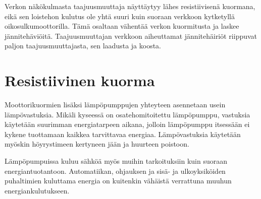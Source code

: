   Verkon näkökulmasta taajuusmuuttaja näyttäytyy lähes resistiivisenä kuormana, eikä sen loistehon kulutus ole yhtä suuri kuin suoraan verkkoon kytketyllä oikosulkumoottorilla. Tämä osaltaan vähentää verkon kuormitusta ja laskee jännitehäviöitä. Taajuusmuuttajan verkkoon aiheuttamat jännitehäiriöt riippuvat paljon taajuusmuuttajasta, sen laadusta ja koosta.

\section{Resistiivinen kuorma}
  Moottorikuormien lisäksi lämpöpumppujen yhteyteen asennetaan usein lämpövastuksia. Mikäli kyseessä on osatehomitoitettu lämpöpumppu, vastuksia käytetään suurimman energiatarpeen aikana, jolloin lämpöpumppu itsessään ei kykene tuottamaan kaikkea tarvittavaa energiaa. Lämpövastuksia käytetään myöskin höyrystimeen kertyneen jään ja huurteen poistoon.

  Lämpöpumpuissa kuluu sähköä myös muihin tarkoituksiin kuin suoraan energiantuotantoon. Automatiikan, ohjauksen ja sisä- ja ulkoyksiköiden puhaltimien kuluttama energia on kuitenkin vähäistä verrattuna muuhun energiankulutukseen.
